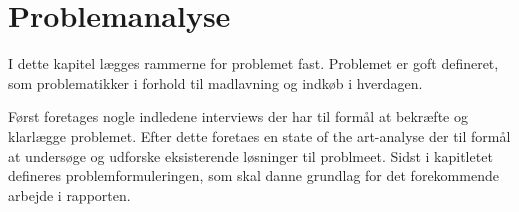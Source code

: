 \chapter{Problemanalyse}\label{chapter:problemanalyse}
I dette kapitel lægges rammerne for problemet fast.
Problemet er goft defineret, som problematikker i forhold til madlavning og indkøb i hverdagen.

Først foretages nogle indledene interviews der har til formål at bekræfte og klarlægge problemet.
Efter dette foretaes en state of the art-analyse der til formål at undersøge og udforske eksisterende løsninger til problmeet.
Sidst i kapitletet defineres problemformuleringen, som skal danne grundlag for det forekommende arbejde i rapporten.





